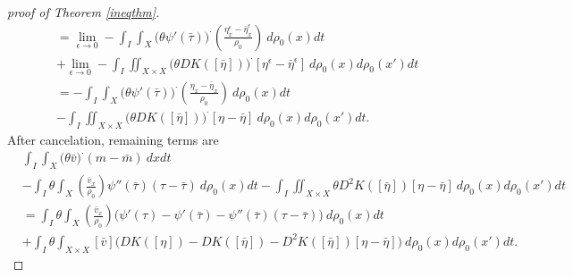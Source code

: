 \documentclass[10pt, letterpaper]{article}
\def\drr{{d\rho_0(x)d\rho_0(x')}}
\def\dr{{d\rho_0(x)}}
\def\bdot{{\boldsymbol{\cdot}}}
\theoremstyle{definition}
\theoremstyle{remark}
\begin{document}
\begin{proof}[proof of Theorem \ref{ineqthm}]
\begin{equation}
\begin{aligned}
 &=\lim_{\epsilon \rightarrow 0}-\int_I\int_X \big(\theta\psi'(\bar\tau)\big)^\bdot \left(\frac{{\eta}^\epsilon_x - {\bar\eta}^\epsilon_x}{\rho_0}\right) \:\dr dt \\
 &+\lim_{\epsilon \rightarrow 0}-\int_I\iint_{X\times X} \big(\theta DK([\bar\eta])\big)^\bdot [\eta^\epsilon-\bar\eta^\epsilon] \:\drr dt \\
 &= -\int_I\int_X \big(\theta\psi'(\bar\tau)\big)^\bdot \left(\frac{{\eta}_x - {\bar\eta}_x}{\rho_0}\right) \:\dr dt \\
 &-\int_I\iint_{X\times X} \big(\theta DK([\bar\eta])\big)^\bdot [\eta-\bar\eta] \:\drr dt.
\end{aligned}
\end{equation}
After cancelation, remaining terms are
\begin{align*}
 &\int_I\int_X \big(\theta \bar{v}\big)^\bdot ({m}-\bar{{m}}) \:dxdt\\
 &-\int_I\theta \int_X \left(\frac{\bar{v}_x}{\rho_0}\right)\psi''(\bar\tau) (\tau - \bar\tau)\: \dr dt
 -\int_I\iint_{X\times X}\theta D^2 K([\bar\eta])[\eta-\bar\eta] \:\drr dt\\
 &= \int_I \theta \int_X \left(\frac{\bar{v}_x}{\rho_0}\right) \Big( \psi'(\tau) - \psi'(\bar\tau) - \psi''(\bar\tau)(\tau - \bar\tau)\Big) \: \dr dt\\
 &+ \int_I \theta \int_{X\times X} [\bar v] \Big( DK([\eta]) - DK([\bar\eta]) - D^2K([\bar\eta])[\eta-\bar\eta]\Big) \: \drr dt.
\end{align*}


\end{proof}
\end{document}
